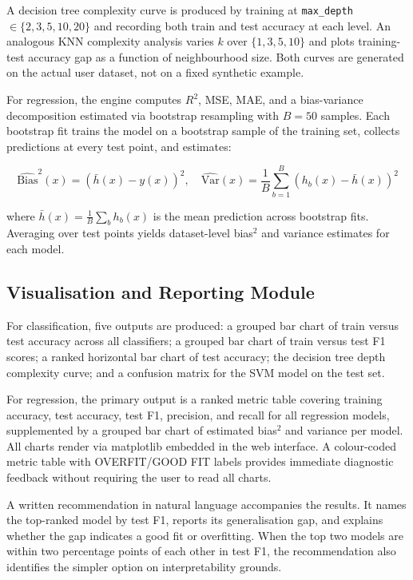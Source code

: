 \documentclass[conference]{IEEEtran}
\begin{document}
A decision tree complexity curve is produced by training at \texttt{max\_depth} $\in \{2, 3, 5, 10, 20\}$ and recording both train and test accuracy at each level. An analogous KNN complexity analysis varies $k$ over $\{1, 3, 5, 10\}$ and plots training-test accuracy gap as a function of neighbourhood size. Both curves are generated on the actual user dataset, not on a fixed synthetic example.

For regression, the engine computes $R^2$, MSE, MAE, and a bias-variance decomposition estimated via bootstrap resampling with $B = 50$ samples. Each bootstrap fit trains the model on a bootstrap sample of the training set, collects predictions at every test point, and estimates:

\begin{equation}
\hat{\text{Bias}}^2(x) = \left(\bar{h}(x) - y(x)\right)^2, \quad \hat{\text{Var}}(x) = \frac{1}{B}\sum_{b=1}^B \left(h_b(x) - \bar{h}(x)\right)^2
\end{equation}

where $\bar{h}(x) = \frac{1}{B}\sum_b h_b(x)$ is the mean prediction across bootstrap fits. Averaging over test points yields dataset-level bias$^2$ and variance estimates for each model.

\subsection{Visualisation and Reporting Module}

For classification, five outputs are produced: a grouped bar chart of train versus test accuracy across all classifiers; a grouped bar chart of train versus test F1 scores; a ranked horizontal bar chart of test accuracy; the decision tree depth complexity curve; and a confusion matrix for the SVM model on the test set.

For regression, the primary output is a ranked metric table covering training accuracy, test accuracy, test F1, precision, and recall for all regression models, supplemented by a grouped bar chart of estimated bias$^2$ and variance per model. All charts render via matplotlib embedded in the web interface. A colour-coded metric table with OVERFIT/GOOD FIT labels provides immediate diagnostic feedback without requiring the user to read all charts.

A written recommendation in natural language accompanies the results. It names the top-ranked model by test F1, reports its generalisation gap, and explains whether the gap indicates a good fit or overfitting. When the top two models are within two percentage points of each other in test F1, the recommendation also identifies the simpler option on interpretability grounds.
\end{document}
